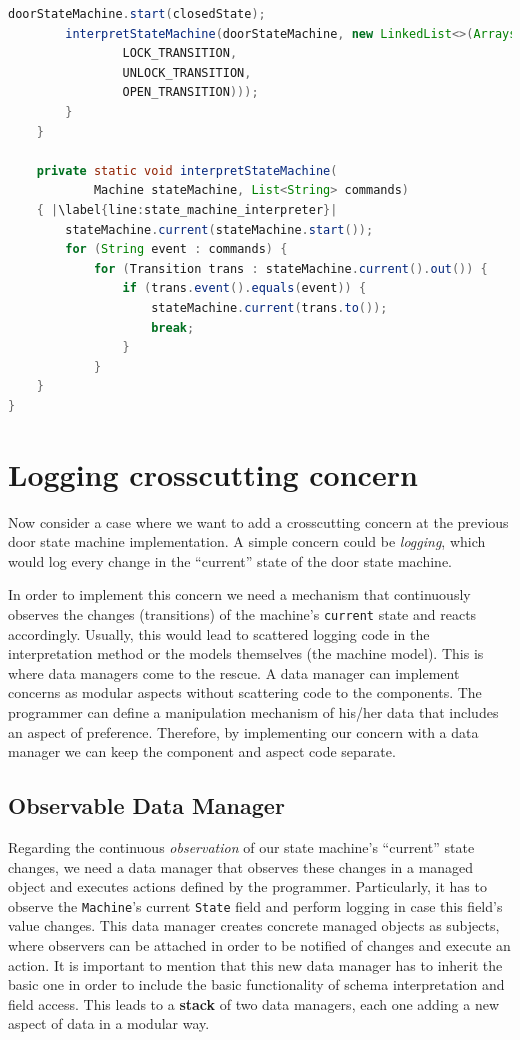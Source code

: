 \begin{sourcecode}
\begin{lstlisting}[language=Java, escapechar=|]
		doorStateMachine.start(closedState);
		interpretStateMachine(doorStateMachine, new LinkedList<>(Arrays.asList(
				LOCK_TRANSITION,
				UNLOCK_TRANSITION,
				OPEN_TRANSITION)));
		}	
	}

	private static void interpretStateMachine(
			Machine stateMachine, List<String> commands) 
	{ |\label{line:state_machine_interpreter}|
	    stateMachine.current(stateMachine.start());
		for (String event : commands) {
			for (Transition trans : stateMachine.current().out()) {
				if (trans.event().equals(event)) {
					stateMachine.current(trans.to());
					break;
				}
			}
	}
}
	\end{lstlisting}
	\caption{Door state machine}
	\label{lst:Door_state_machine}
\end{sourcecode}

\section{Logging crosscutting concern}
Now consider a case where we want to add a crosscutting concern at the previous door state machine implementation.
A simple concern could be \textit{logging}, which would log every change in the ``current'' state of the door state machine.

In order to implement this concern we need a mechanism that continuously observes the changes (transitions) of the machine's \texttt{current} state and reacts accordingly.
Usually, this would lead to scattered logging code in the interpretation method or the models themselves (the machine model).
This is where data managers come to the rescue.
A data manager can implement concerns as modular aspects without scattering code to the components.
The programmer can define a manipulation mechanism of his/her data that includes an aspect of preference.
Therefore, by implementing our concern with a data manager we can keep the component and aspect code separate.

\subsection{Observable Data Manager}
Regarding the continuous \textit{observation} of our state machine's ``current'' state changes, we need a data manager that observes these changes in a managed object and executes actions defined by the programmer.
Particularly, it has to observe the \texttt{Machine}'s current \texttt{State} field and perform logging in case this field's value changes.
This data manager creates concrete managed objects as subjects, where observers can be attached in order to be notified of changes and execute an action.
It is important to mention that this new data manager has to inherit the basic one in order to include the basic functionality of schema interpretation and field access.
This leads to a \textbf{stack} of two data managers, each one adding a new aspect of data in a modular way.

